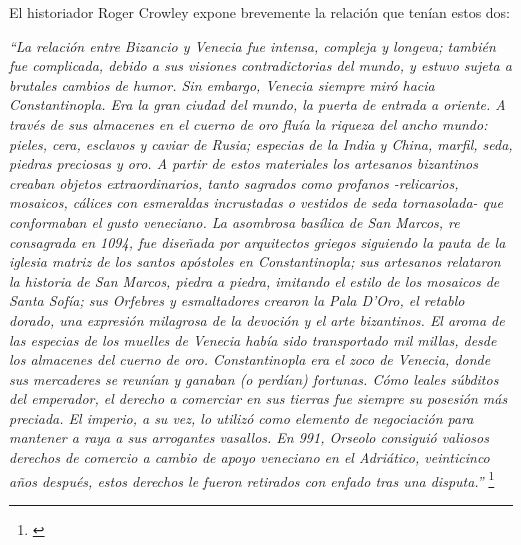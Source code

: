El historiador Roger Crowley expone brevemente la relación 
que tenían estos dos:

\textit{“La relación entre Bizancio y Venecia fue intensa, compleja y longeva; 
también fue complicada, debido a sus visiones contradictorias del mundo, 
y estuvo sujeta a brutales cambios de humor. Sin embargo, Venecia siempre 
miró hacia Constantinopla. Era la gran ciudad del mundo, la puerta de 
entrada a oriente. A través de sus almacenes en el cuerno de oro fluía 
la riqueza del ancho mundo: pieles, cera, esclavos y caviar de Rusia; 
especias de la India y China, marfil, seda, piedras preciosas y oro. 
A partir de estos materiales los artesanos bizantinos creaban objetos 
extraordinarios, tanto sagrados como profanos -relicarios, mosaicos, 
cálices con esmeraldas incrustadas o vestidos de seda tornasolada- 
que conformaban el gusto veneciano. La asombrosa basílica de San Marcos, 
re consagrada en 1094, fue diseñada por arquitectos griegos siguiendo la 
pauta de la iglesia matriz de los santos apóstoles en Constantinopla; 
sus artesanos relataron la historia de San Marcos, piedra a piedra, 
imitando el estilo de los mosaicos de Santa Sofía; sus Orfebres y 
esmaltadores crearon la Pala D’Oro, el retablo dorado, una expresión 
milagrosa de la devoción y el arte bizantinos. 
El aroma de las especias de los muelles de Venecia había sido 
transportado mil millas, desde los almacenes del cuerno de oro. 
Constantinopla era el zoco de Venecia, donde sus mercaderes se reunían y
 ganaban (o perdían) fortunas. Cómo leales súbditos del emperador, 
 el derecho a comerciar en sus tierras fue siempre su posesión 
 más preciada. El imperio, a su vez, lo utilizó como elemento de 
 negociación para mantener a raya a sus arrogantes vasallos. 
 En 991, Orseolo consiguió valiosos derechos de comercio a cambio 
 de apoyo veneciano en el Adriático, veinticinco años después, 
 estos derechos le fueron retirados con enfado tras una disputa.”
 }\footnote{\cite[pp.~39--40]{venecia}}












